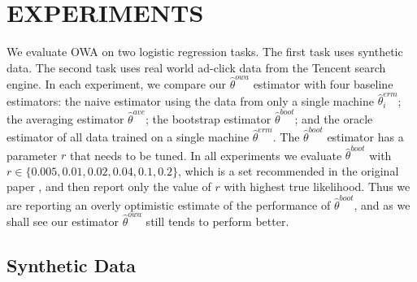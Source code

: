 \documentclass[twoside]{article}
\newcommand{\w}{\theta}
\newcommand{\wowa}{\hat\w^{owa}}
\newcommand{\wave}{\hat\w^{ave}}
\newcommand{\wboot}{\hat\w^{boot}}
\newcommand{\wmle}{\hat\w^{erm}}
\begin{document}
\section{EXPERIMENTS}
\label{sec:exp}

We evaluate OWA on two logistic regression tasks.
The first task uses synthetic data.
The second task uses real world ad-click data from the Tencent search engine.
In each experiment, we compare our $\wowa$ estimator with four baseline estimators:
the naive estimator using the data from only a single machine $\wmle_i$;
the averaging estimator $\wave$;
the bootstrap estimator $\wboot$;
and the oracle estimator of all data trained on a single machine $\wmle$.
The $\wboot$ estimator has a parameter $r$ that needs to be tuned.
In all experiments we evaluate $\wboot$ with $r \in \{0.005,0.01,0.02,0.04,0.1,0.2\}$,
which is a set recommended in the original paper \citep{zhang2012communication},
and then report only the value of $r$ with highest true likelihood.
Thus we are reporting an overly optimistic estimate of the performance of $\wboot$,
and as we shall see our estimator $\wowa$ still tends to perform better.

\subsection{Synthetic Data}
\end{document}
